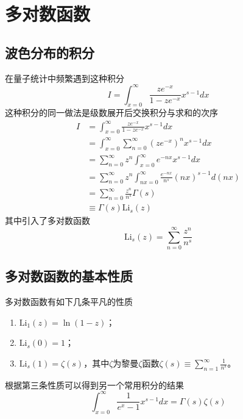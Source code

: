 \documentclass[a4paper,11pt]{ctexart}
\newcommand{\beq}{\begin{equation}}
\newcommand{\eeq}{\end{equation}}
\newcommand{\bea}{\begin{equation}\begin{aligned}}
\newcommand{\eea}{\end{aligned}\end{equation}}
\newcommand{\Li}[1]{\mathrm{Li}_{#1}}
\begin{document}
\section{多对数函数}
\subsection{波色分布的积分}
在量子统计中频繁遇到这种积分
\beq
I = \int_{x=0}^\infty \frac{ze^{-x}}{1 - ze^{-x}} x^{s-1} dx
\eeq
这种积分的同一做法是级数展开后交换积分与求和的次序
\bea
I &= \int_{x=0}^\infty \frac{ze^{-x}}{1 - ze^{-x}} x^{s-1} dx \\
&= \int_{x=0}^\infty \sum_{n=0}^\infty \left( ze^{-x}\right)^n x^{s-1} dx\\
&= \sum_{n=0}^\infty z^n \int_{x=0}^\infty  e^{-nx} x^{s-1} dx\\
&= \sum_{n=0}^\infty z^n \int_{nx=0}^\infty  \frac{e^{-nx}}{n^s} (nx)^{s-1} d(nx)\\
&= \sum_{n=0}^\infty \frac{z^n}{n^s} \Gamma(s) \\
&\equiv \Gamma(s) \Li{s}(z)
\eea
其中引入了多对数函数
\beq
\Li{s}(z) = \sum_{n=0}^\infty \frac{z^n}{n^s}
\eeq
\subsection{多对数函数的基本性质}
多对数函数有如下几条平凡的性质
\begin{enumerate}
\item $\Li{1}(z) = \ln (1 - z)$；
\item $\Li{s}(0) = 1$；
\item $\Li{s}(1) = \zeta(s)$，其中$\zeta$为黎曼$\zeta$函数$\zeta(s) \equiv \sum_{n=1}^\infty \frac{1}{n^s}$。
\end{enumerate}
根据第三条性质可以得到另一个常用积分的结果
\beq
\int_{x=0}^\infty \frac{1}{e^{x} - 1} x^{s-1} dx = \Gamma(s) \zeta(s)
\eeq
\end{document}
